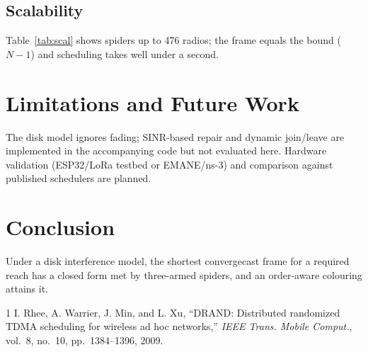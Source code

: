 \IfFileExists{IEEEtran.cls}{\documentclass[journal]{IEEEtran}}{\documentclass[10pt,twocolumn]{article}\usepackage[margin=0.75in]{geometry}\newcommand{\IEEEkeywords}{\textbf{Index Terms---}}}
\begin{document}
\subsection{Scalability}
Table~\ref{tab:scal} shows spiders up to 476 radios; the frame equals the bound ($N-1$) and scheduling takes well under a second.
\begin{table}[t]\centering\caption{Spider topologies, scheduling time on one CPU core.}\label{tab:scal}\end{table}

\section{Limitations and Future Work}
The disk model ignores fading; SINR-based repair and dynamic join/leave are implemented in the accompanying code but not evaluated here. Hardware validation (ESP32/LoRa testbed or EMANE/ns-3) and comparison against published schedulers are planned.

\section{Conclusion}
Under a disk interference model, the shortest convergecast frame for a required reach has a closed form met by three-armed spiders, and an order-aware colouring attains it.

\begin{thebibliography}{1}
 I. Rhee, A. Warrier, J. Min, and L. Xu, ``DRAND: Distributed randomized TDMA scheduling for wireless ad hoc networks,'' \emph{IEEE Trans. Mobile Comput.}, vol.~8, no.~10, pp.~1384--1396, 2009.
\end{thebibliography}
\end{document}
